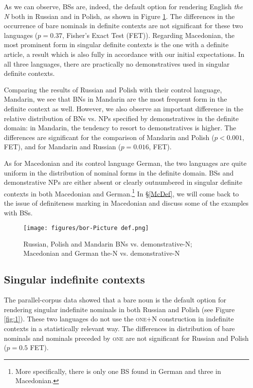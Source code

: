 \documentclass[output=paper,colorlinks,citecolor=brown]{langscibook}
\begin{document}
 As we can observe, BSs are, indeed, the default option for rendering English \textit{the N} both in Russian and in Polish, as shown in Figure \ref{fig:2}. The differences in the occurrence of bare nominals in definite contexts are not significant for these two languages ($p = 0.37$, Fisher's Exact Test (FET)). Regarding Macedonian, the most prominent form in singular definite contexts is the one with a definite article, a result which is also fully in accordance with our initial expectations. In all three languages, there are practically no demonstratives used in singular definite contexts. 

 Comparing the results of Russian and Polish with their control language, Mandarin, we see that BNs in Mandarin are the most frequent form in the definite context as well.  However, we also observe an important difference in the relative distribution of BNs vs. NPs specified by demonstratives in the definite domain: in Mandarin, the tendency to resort to demonstratives is higher. The differences are significant for the comparison of  Mandarin and Polish ($p < 0.001$, FET),  and for Mandarin and Russian ($p = 0.016$, FET). 

As for Macedonian and its control language German, the two languages are quite uniform in the distribution of nominal forms in the definite domain. BSs and demonstrative NPs are either absent or clearly outnumbered in singular definite contexts in both Macedonian and German.\footnote{More specifically, there is only one BS found in German and three in Macedonian.} In \S \ref{McDef}, we will come back to the issue of definiteness marking in Macedonian and discuss some of the examples with BSs. 

\begin{figure}[H]
    \centering
    \texttt{[image: figures/bor-Picture def.png]}
    \caption{Russian, Polish and Mandarin BNs vs. demonstrative-N; \\
Macedonian and German the-N vs. demonstrative-N}
    \label{fig:2}
\end{figure}

\subsection{Singular indefinite contexts}
The parallel-corpus data showed that a bare noun is the default option for rendering singular indefinite nominals in both Russian and Polish (see Figure \ref{fig:1}). These two languages do not use the \textsc{one}$+$N construction in indefinite contexts in a statistically relevant way. The differences in distribution of bare nominals and nominals preceded by \textsc{one} are not significant for Russian and Polish ($p = 0.5$ FET). 
\end{document}
